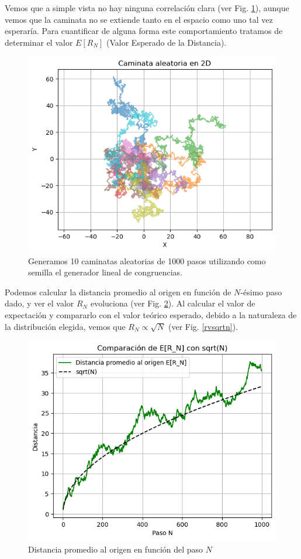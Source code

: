 \documentclass[baaa]{baaa}
\begin{document}
Vemos que a simple vista no hay ninguna correlación clara (ver Fig. \ref{randomwalk}), aunque vemos que la caminata no se extiende tanto en el espacio como uno tal vez esperaría. Para cuantificar de alguna forma este comportamiento tratamos de determinar el valor $E[R_N]$ (Valor Esperado de la Distancia).

\begin{figure}[!h]
    \centering
    \includegraphics[width=0.9\linewidth]{imagenes/randomwalk.png}
    \caption{Generamos 10 caminatas aleatorias de 1000 pasos utilizando como semilla el generador lineal de congruencias.}
    \label{randomwalk}
\end{figure}

 Podemos calcular la distancia promedio al origen en función de $N$-ésimo paso dado, y ver el valor $R_N$ evoluciona (ver Fig. \ref{rvn}). Al calcular el valor de expectación y compararlo con el valor teórico esperado, debido a la naturaleza de la distribución elegida, vemos que $R_N \propto \sqrt{N}$ (ver Fig. \ref{rvsqrtn}).

\begin{figure}[!h]
    \centering
    \includegraphics[width=0.9\linewidth]{imagenes/rvn.png}
    \caption{Distancia promedio al origen en función del paso $N$}
    \label{rvn}
\end{figure}
\end{document}
